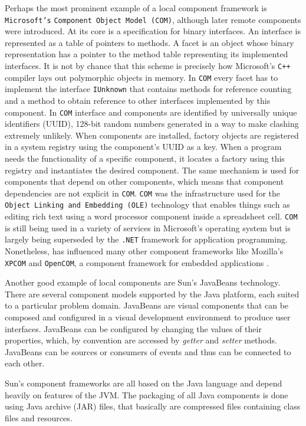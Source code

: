Perhaps the most prominent example of a local component framework is \texttt{Microsoft's} \texttt{Component Object Model (COM)}, although
later remote components were introduced. At its core is a specification for binary interfaces. An interface is represented as a table of
pointers to methods. A facet is an object whose binary representation has a pointer to the method table representing its implemented interfaces.
It is not by chance that this scheme is precisely how Microsoft's \texttt{C++} compiler lays out polymorphic objects in memory.
In \texttt{COM} every facet has to implement the interface \texttt{IUnknown} that contains methods for reference counting and a method
to obtain reference to other interfaces implemented by this component. In \texttt{COM} interface and components are identified by
universally unique identifiers (UUID), 128-bit random numbers generated in a way to make clashing extremely unlikely.
When components are installed, factory objects are registered in a system registry using the component's UUID as a key.
When a program needs the functionality of a specific component, it locates a factory using this registry and instantiates the desired component.
The same mechanism is used for components that depend on other components, which means that component dependencies are not explicit
in \texttt{COM}. \texttt{COM} was the infrastructure used for the \texttt{Object Linking and Embedding (OLE)} technology that enables
things such as editing rich text using a word processor component inside a spreadsheet cell. \texttt{COM} is still being used
in a variety of services in Microsoft's operating system but is largely being superseded by the \texttt{.NET} framework for application
programming. Nonetheless, has influenced many other component frameworks like Mozilla's \texttt{XPCOM} and \texttt{OpenCOM}, a component
framework for embedded applications \cite{XPCOM} \cite{OpenCOM01}.

Another good example of local components are Sun's JavaBeans technology. There are several component models supported by the Java platform, each
suited to a particular problem domain. JavaBeans are visual components that can be composed and configured in a visual development environment
to produce user interfaces. JavaBeans can be configured by changing the values of their properties, which, by convention are accessed by \emph{getter}
and \emph{setter} methods. JavaBeans can be sources or consumers of events and thus can be connected to each other. 

Sun's component frameworks are all based on the Java language and depend heavily on features of the JVM. The packaging of all Java components is
done using Java archive (JAR) files, that basically are compressed files containing class files and resources.

